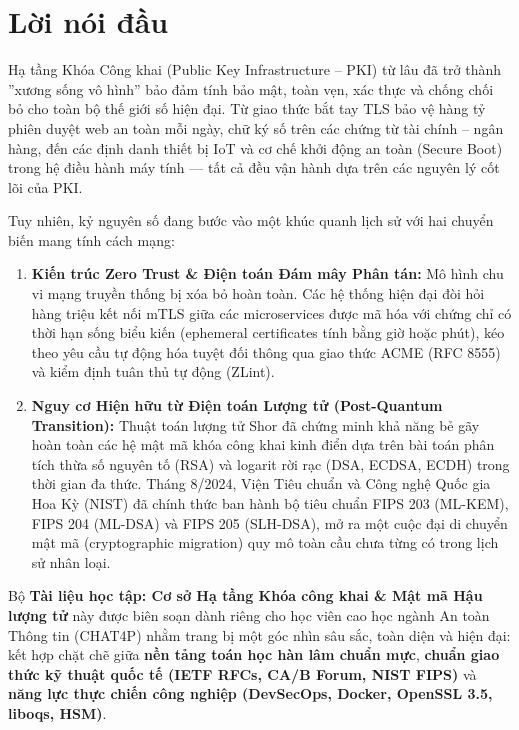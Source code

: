 \documentclass{hcmut-textbook}
\begin{document}
\chapter*{Lời nói đầu}

Hạ tầng Khóa Công khai (Public Key Infrastructure -- PKI) từ lâu đã trở thành ''xương sống vô hình'' bảo đảm tính bảo mật, toàn vẹn, xác thực và chống chối bỏ cho toàn bộ thế giới số hiện đại. Từ giao thức bắt tay TLS bảo vệ hàng tỷ phiên duyệt web an toàn mỗi ngày, chữ ký số trên các chứng từ tài chính -- ngân hàng, đến các định danh thiết bị IoT và cơ chế khởi động an toàn (Secure Boot) trong hệ điều hành máy tính --- tất cả đều vận hành dựa trên các nguyên lý cốt lõi của PKI.

Tuy nhiên, kỷ nguyên số đang bước vào một khúc quanh lịch sử với hai chuyển biến mang tính cách mạng:
\begin{enumerate}
  \item \textbf{Kiến trúc Zero Trust \& Điện toán Đám mây Phân tán:} Mô hình chu vi mạng truyền thống bị xóa bỏ hoàn toàn. Các hệ thống hiện đại đòi hỏi hàng triệu kết nối mTLS giữa các microservices được mã hóa với chứng chỉ có thời hạn sống biểu kiến (ephemeral certificates tính bằng giờ hoặc phút), kéo theo yêu cầu tự động hóa tuyệt đối thông qua giao thức ACME (RFC 8555) và kiểm định tuân thủ tự động (ZLint).
  \item \textbf{Nguy cơ Hiện hữu từ Điện toán Lượng tử (Post-Quantum Transition):} Thuật toán lượng tử Shor đã chứng minh khả năng bẻ gãy hoàn toàn các hệ mật mã khóa công khai kinh điển dựa trên bài toán phân tích thừa số nguyên tố (RSA) và logarit rời rạc (DSA, ECDSA, ECDH) trong thời gian đa thức. Tháng 8/2024, Viện Tiêu chuẩn và Công nghệ Quốc gia Hoa Kỳ (NIST) đã chính thức ban hành bộ tiêu chuẩn FIPS 203 (ML-KEM), FIPS 204 (ML-DSA) và FIPS 205 (SLH-DSA), mở ra một cuộc đại di chuyển mật mã (cryptographic migration) quy mô toàn cầu chưa từng có trong lịch sử nhân loại.
\end{enumerate}

Bộ \textbf{Tài liệu học tập: Cơ sở Hạ tầng Khóa công khai \& Mật mã Hậu lượng tử} này được biên soạn dành riêng cho học viên cao học ngành An toàn Thông tin (CHAT4P) nhằm trang bị một góc nhìn sâu sắc, toàn diện và hiện đại: kết hợp chặt chẽ giữa \textbf{nền tảng toán học hàn lâm chuẩn mực}, \textbf{chuẩn giao thức kỹ thuật quốc tế (IETF RFCs, CA/B Forum, NIST FIPS)} và \textbf{năng lực thực chiến công nghiệp (DevSecOps, Docker, OpenSSL 3.5, liboqs, HSM)}.
\end{document}
